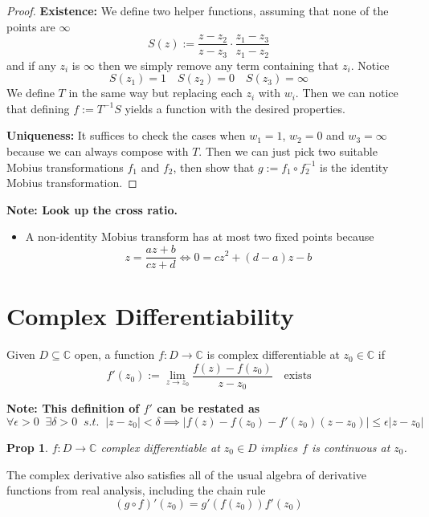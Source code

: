 \documentclass[11pt]{article}
\newcommand{\defeq}{:=}
\newcommand{\abs}[1]{\left|#1\right|}
\newcommand{\C}{\mathbb{C}}
\newenvironment{defin}
	{\begin{mdframed}[backgroundcolor=white, roundcorner=5pt, linewidth=1pt]}
	{\end{mdframed}}
\newcommand{\mdf}[1]{{\color{red} #1}}
\newenvironment{note}
	{\begin{mdframed}[backgroundcolor=white, linecolor=red, roundcorner=5pt, linewidth=1pt]\bfseries{Note:}\normalfont}
	{\end{mdframed}}
\newtheorem{prop}[theorem]{Prop}
\begin{document}
\begin{proof}
\textbf{Existence: }
We define two helper functions, assuming that none of the points are $\infty$
\[
	S(z)\defeq\frac{z-z_2}{z-z_3}\cdot\frac{z_1-z_3}{z_1-z_2}
\]
and if any $z_i$ is $\infty$ then we simply remove any term containing that $z_i$.
Notice
\[
	S(z_1) = 1 \quad S(z_2) = 0 \quad S(z_3) = \infty
\]
We define $T$ in the same way but replacing each $z_i$ with $w_i$.
Then we can notice that defining $f\defeq T^{-1}S$ yields a function with the desired properties.

\textbf{Uniqueness: }
It suffices to check the cases when $w_1=1$, $w_2=0$ and $w_3=\infty$ because we can always compose with $T$.
Then we can just pick two suitable Mobius transformations $f_1$ and $f_2$, then show that $g\defeq f_1\circ f_2^{-1}$ is the identity Mobius transformation.
\end{proof}

\begin{note}
Look up the cross ratio.
\begin{itemize}
	\item A non-identity Mobius transform has at most two fixed points because
		\[
			z=\frac{az+b}{cz+d}\iff 0 =cz^2 + (d-a)z -b
		\]
\end{itemize}
\end{note}

\section{Complex Differentiability}

\begin{defin}
	Given $D\subseteq \C$ open, a function $f:D\to \C$ is \mdf{complex differentiable at $z_0\in\C$} if
	\[
		f'(z_0)\defeq\lim_{z\to z_0}\frac{f(z)-f(z_0)}{z-z_0}\quad\text{exists}
	\]
\end{defin}

\begin{note}
This definition of $f'$ can be restated as 
\[
	\forall \epsilon >0 \;\; \exists\delta >0 \;\; s.t. \;\; \abs{z- z_0} < \delta \implies \abs{f(z)-f(z_0)- f'(z_0)(z- z_0)} \leq \epsilon \abs{z- z_0}
\]
\end{note}

\begin{prop}
$f:D\to\C$ complex differentiable at $z_0\in D$ $implies$ $f$ is continuous at $z_0$.
\end{prop}

The complex derivative also satisfies all of the usual algebra of derivative functions from real analysis, including the chain rule
\[
	(g\circ f)'(z_0) = g'(f(z_0))f'(z_0)
\]
\end{document}

